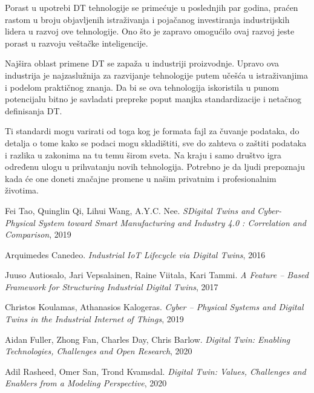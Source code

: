 \documentclass[a4paper]{article}
\begin{document}
{Porast u upotrebi DT tehnologije se primećuje u poslednjih par godina, praćen rastom u
broju objavljenih istraživanja i pojačanog investiranja industrijskih lidera u razvoj ove
tehnologije. Ono što je zapravo omogućilo ovaj razvoj jeste porast u razvoju veštačke
inteligencije. \cite{enablingtechnologies}

Najšira oblast primene DT se zapaža u industriji proizvodnje. Upravo ova industrija
je najzaslužnija za razvijanje tehnologije putem učešća u istraživanjima i podelom praktičnog
znanja. Da bi se ova tehnologija iskoristila u punom potencijalu bitno je savladati prepreke poput
manjka standardizacije i netačnog definisanja DT. \cite{enablingtechnologies}

Ti standardi mogu varirati od toga kog je formata fajl za čuvanje podataka, do detalja o tome
kako se podaci mogu skladištiti, sve do zahteva o zaštiti podataka i razlika u zakonima na tu
temu širom sveta. Na kraju i samo društvo igra određenu ulogu u prihvatanju novih tehnologija.
Potrebno je da ljudi prepoznaju kada će one doneti značajne promene u našim privatnim i
profesionalnim životima. \cite{values}

\newpage

\appendix

\begin{thebibliography}{9}
	
 Fei Tao, Quinglin Qi, Lihui Wang, A.Y.C. Nee. \emph{SDigital Twins and Cyber-Physical System toward Smart Manufacturing and Industry 4.0 : Correlation
	and Comparison}, 2019

 Arquimedes Canedeo. \emph{Industrial IoT Lifecycle via Digital Twins}, 2016

 Juuso Autiosalo, Jari
Vepsalainen, Raine Viitala, Kari Tammi. \emph{A Feature – Based Framework for Structuring Industrial Digital Twins}, 2017

 Christos Koulamas,
Athanasios Kalogeras. \emph{Cyber – Physical Systems and Digital Twins in the Industrial Internet of Things}, 2019

 Aidan Fuller, Zhong Fan,
Charles Day, Chris Barlow. \emph{Digital Twin: Enabling Technologies, Challenges and Open Research}, 2020

 Adil Rasheed, Omer
San, Trond Kvamsdal. \emph{Digital Twin: Values, Challenges and Enablers from a Modeling Perspective}, 2020


\end{thebibliography}}
\end{document}
